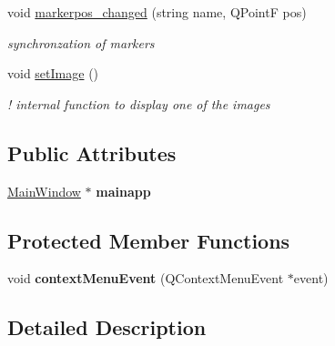 \begin{DoxyCompactItemize}
\item 
\hypertarget{class_atomimg_a41a88b957bf8f5d7e21fc260bdc7d949}{
void \hyperlink{class_atomimg_a41a88b957bf8f5d7e21fc260bdc7d949}{markerpos\_\-changed} (string name, QPointF pos)}
\label{class_atomimg_a41a88b957bf8f5d7e21fc260bdc7d949}

\begin{DoxyCompactList}\small\item\em synchronzation of markers \item\end{DoxyCompactList}\item 
\hypertarget{class_atomimg_acaefa7202c8197f3215fe77fcb1edf88}{
void \hyperlink{class_atomimg_acaefa7202c8197f3215fe77fcb1edf88}{setImage} ()}
\label{class_atomimg_acaefa7202c8197f3215fe77fcb1edf88}

\begin{DoxyCompactList}\small\item\em ! internal function to display one of the images \item\end{DoxyCompactList}\end{DoxyCompactItemize}
\subsection*{Public Attributes}
\begin{DoxyCompactItemize}
\item 
\hypertarget{class_atomimg_a0d86e38154509efb7d3617ad41238e9a}{
\hyperlink{class_main_window}{MainWindow} $\ast$ {\bfseries mainapp}}
\label{class_atomimg_a0d86e38154509efb7d3617ad41238e9a}

\end{DoxyCompactItemize}
\subsection*{Protected Member Functions}
\begin{DoxyCompactItemize}
\item 
\hypertarget{class_atomimg_adc1d96715fa449f77b6b7fcb78855b7e}{
void {\bfseries contextMenuEvent} (QContextMenuEvent $\ast$event)}
\label{class_atomimg_adc1d96715fa449f77b6b7fcb78855b7e}

\end{DoxyCompactItemize}


\subsection{Detailed Description}


